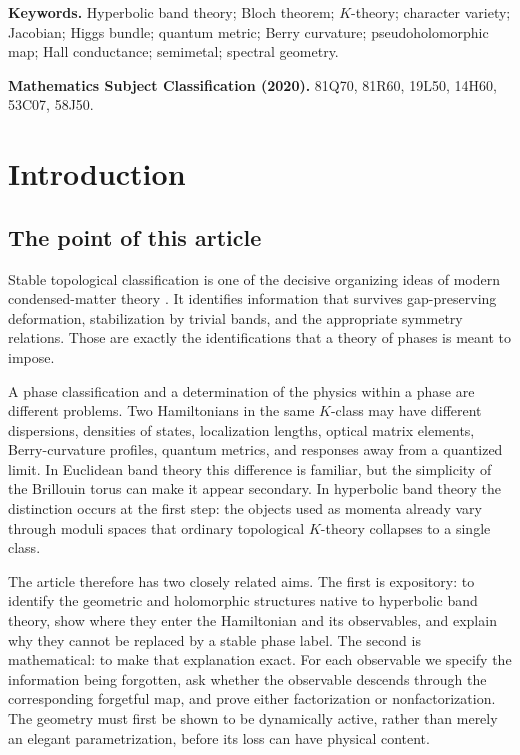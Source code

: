 \documentclass[11pt]{article}
\theoremstyle{definition}
\theoremstyle{remark}
\begin{document}
\noindent\textbf{Keywords.}
Hyperbolic band theory; Bloch theorem; \(K\)-theory; character variety;
Jacobian; Higgs bundle; quantum metric; Berry curvature; pseudoholomorphic
map; Hall conductance; semimetal; spectral geometry.

\medskip
\noindent\textbf{Mathematics Subject Classification (2020).}
81Q70, 81R60, 19L50, 14H60, 53C07, 58J50.

\tableofcontents

\section{Introduction}

\subsection{The point of this article}

Stable topological classification is one of the decisive
organizing ideas of modern condensed-matter theory
\cite{KitaevPeriodicTable,ProdanSchulzBaldes}.  It identifies information that
survives gap-preserving deformation, stabilization by trivial bands, and the
appropriate symmetry relations.  Those are exactly the identifications that
a theory of phases is meant to impose.

A phase classification and a determination of the physics within a phase are
different problems.  Two Hamiltonians in the same \(K\)-class may have
different dispersions, densities of states, localization lengths, optical
matrix elements, Berry-curvature profiles, quantum metrics, and responses away
from a quantized limit.  In Euclidean band theory this difference is familiar,
but the simplicity of the Brillouin torus can make it appear secondary.  In
hyperbolic band theory the distinction occurs at the first step: the objects
used as momenta already vary through moduli spaces that ordinary topological
\(K\)-theory collapses to a single class.

The article therefore has two closely related aims.  The first is expository:
to identify the geometric and holomorphic structures native to hyperbolic
band theory, show where they enter the Hamiltonian and its observables, and
explain why they cannot be replaced by a stable phase label.  The second is
mathematical: to make that explanation exact.  For each observable we specify
the information being forgotten, ask whether the observable descends through
the corresponding forgetful map, and prove either factorization or
nonfactorization.  The geometry must first be shown to be dynamically active,
rather than merely an elegant parametrization, before its loss can have
physical content.
\end{document}
